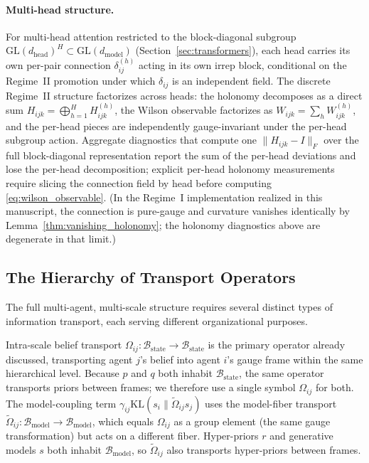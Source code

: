 \documentclass[11pt]{article}
\begin{document}
\paragraph{Multi-head structure.} For multi-head attention restricted to the block-diagonal subgroup $\mathrm{GL}(d_{\mathrm{head}})^H \subset \mathrm{GL}(d_{\mathrm{model}})$ (Section~\ref{sec:transformers}), each head carries its own per-pair connection $\delta_{ij}^{(h)}$ acting in its own irrep block, conditional on the Regime~II promotion under which $\delta_{ij}$ is an independent field. The discrete Regime~II structure factorizes across heads: the holonomy decomposes as a direct sum $H_{ijk} = \bigoplus_{h=1}^H H_{ijk}^{(h)}$, the Wilson observable factorizes as $W_{ijk} = \sum_h W_{ijk}^{(h)}$, and the per-head pieces are independently gauge-invariant under the per-head subgroup action. Aggregate diagnostics that compute one $\|H_{ijk} - I\|_F$ over the full block-diagonal representation report the sum of the per-head deviations and lose the per-head decomposition; explicit per-head holonomy measurements require slicing the connection field by head before computing \eqref{eq:wilson_observable}. (In the Regime~I implementation realized in this manuscript, the connection is pure-gauge and curvature vanishes identically by Lemma~\ref{thm:vanishing_holonomy}; the holonomy diagnostics above are degenerate in that limit.)

\subsection{The Hierarchy of Transport Operators}
\label{sec:transport_hierarchy}

The full multi-agent, multi-scale structure requires several distinct types of information transport, each serving different organizational purposes.

Intra-scale belief transport $\Omega_{ij}: \mathcal{B}_{\mathrm{state}} \to \mathcal{B}_{\mathrm{state}}$ is the primary operator already discussed, transporting agent $j$'s belief into agent $i$'s gauge frame within the same hierarchical level. Because $p$ and $q$ both inhabit $\mathcal{B}_{\mathrm{state}}$, the same operator transports priors between frames; we therefore use a single symbol $\Omega_{ij}$ for both. The model-coupling term $\gamma_{ij}\mathrm{KL}(s_i\|\tilde{\Omega}_{ij}s_j)$ uses the model-fiber transport $\tilde{\Omega}_{ij}: \mathcal{B}_{\mathrm{model}} \to \mathcal{B}_{\mathrm{model}}$, which equals $\Omega_{ij}$ as a group element (the same gauge transformation) but acts on a different fiber. Hyper-priors $r$ and generative models $s$ both inhabit $\mathcal{B}_{\mathrm{model}}$, so $\tilde{\Omega}_{ij}$ also transports hyper-priors between frames.
\end{document}
